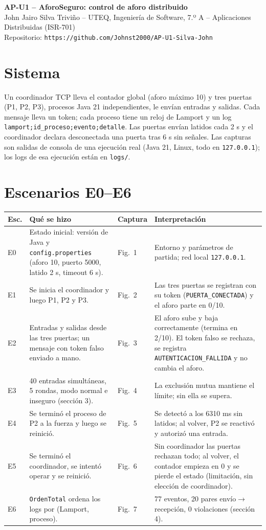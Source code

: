\documentclass[10.5pt,a4paper]{article}
\begin{document}
{\large\textbf{AP-U1 -- AforoSeguro: control de aforo distribuido}}\\
John Jairo Silva Trivi\~no -- UTEQ, Ingenier\'ia de Software, 7.º A -- Aplicaciones Distribuidas (ISR-701)\\
Repositorio: \texttt{https://github.com/Johnst2000/AP-U1-Silva-John}

\section{Sistema}
Un coordinador TCP lleva el contador global (aforo m\'aximo 10) y tres puertas (P1, P2, P3), procesos Java 21 independientes, le env\'ian entradas y salidas. Cada mensaje lleva un token; cada proceso tiene un reloj de Lamport y un log \texttt{lamport;id\_proceso;evento;detalle}. Las puertas env\'ian latidos cada 2 s y el coordinador declara desconectada una puerta tras 6 s sin se\~nales. Las capturas son salidas de consola de una ejecuci\'on real (Java 21, Linux, todo en \texttt{127.0.0.1}); los logs de esa ejecuci\'on est\'an en \texttt{logs/}.

\section{Escenarios E0--E6}
\small
\begin{tabular}{@{}p{0.8cm}p{5.2cm}p{1.1cm}p{8.4cm}@{}}
\toprule
\textbf{Esc.} & \textbf{Qu\'e se hizo} & \textbf{Captura} & \textbf{Interpretaci\'on}\\\midrule
E0 & Estado inicial: versi\'on de Java y \texttt{config.properties} (aforo 10, puerto 5000, latido 2 s, timeout 6 s). & Fig.~1 & Entorno y par\'ametros de partida; red local \texttt{127.0.0.1}.\\
E1 & Se inicia el coordinador y luego P1, P2 y P3. & Fig.~2 & Las tres puertas se registran con su token (\texttt{PUERTA\_CONECTADA}) y el aforo parte en 0/10.\\
E2 & Entradas y salidas desde las tres puertas; un mensaje con token falso enviado a mano. & Fig.~3 & El aforo sube y baja correctamente (termina en 2/10). El token falso se rechaza, se registra \texttt{AUTENTICACION\_FALLIDA} y no cambia el aforo.\\
E3 & 40 entradas simult\'aneas, 5 rondas, modo normal e inseguro (secci\'on 3). & Fig.~4 & La exclusi\'on mutua mantiene el l\'imite; sin ella se supera.\\
E4 & Se termin\'o el proceso de P2 a la fuerza y luego se reinici\'o. & Fig.~5 & Se detect\'o a los 6310 ms sin latidos; al volver, P2 se reactiv\'o y autoriz\'o una entrada.\\
E5 & Se termin\'o el coordinador, se intent\'o operar y se reinici\'o. & Fig.~6 & Sin coordinador las puertas rechazan todo; al volver, el contador empieza en 0 y se pierde el estado (limitaci\'on, sin elecci\'on de coordinador).\\
E6 & \texttt{OrdenTotal} ordena los logs por (Lamport, proceso). & Fig.~7 & 77 eventos, 20 pares env\'io$\to$recepci\'on, 0 violaciones (secci\'on 4).\\
\bottomrule
\end{tabular}
\normalsize
\end{document}
